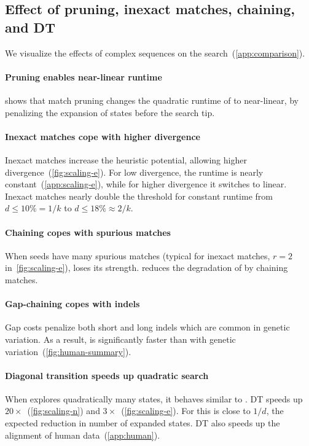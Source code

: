 \subsection{Effect of pruning, inexact matches, chaining, and DT}\label{sec:techniques}

We visualize the effects of complex sequences on the \A
search~(\cref{app:comparison}).

\paragraph{Pruning enables near-linear runtime}
 shows that match pruning changes the quadratic runtime of
\SH to near-linear, by penalizing the expansion of states before the search tip.

\paragraph{Inexact matches cope with higher divergence}
Inexact matches increase the heuristic potential, allowing higher
divergence~(\cref{fig:scaling-e}). For low divergence, the runtime is nearly
constant~(\cref{app:scaling-e}), while for higher divergence it switches to
linear. Inexact matches nearly double the threshold for constant runtime from
$d\leq10\% = 1/k$ to $d\leq18\% \approx2/k$.

\paragraph{Chaining copes with spurious matches}
When seeds have many spurious matches (typical for inexact
matches, $r{=}2$ in~\cref{fig:scaling-e}), \SH loses its strength. \CSH reduces the
degradation of \SH by chaining matches.

\paragraph{Gap-chaining copes with indels}
Gap costs penalize both short and long indels which are common in genetic
variation. As a result, \GCH is significantly faster than \CSH with genetic
variation~(\cref{fig:human-summary}).

\paragraph{Diagonal transition speeds up quadratic search}
When \A explores quadratically many states, it behaves similar to \dijkstra. DT
speeds up \dijkstra $20\times$~(\cref{fig:scaling-n}) and \CSH
$3\times$~(\cref{fig:scaling-e}). For \dijkstra this is close to $1/d$, the
expected reduction in number of expanded states. DT also speeds up the alignment
of human data~(\cref{app:human}).

